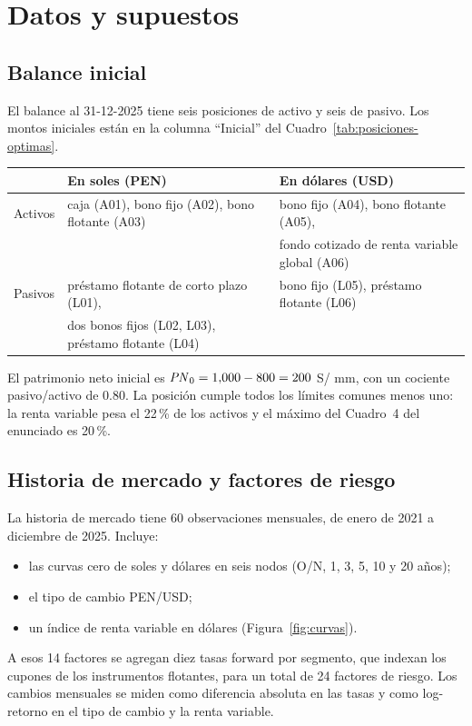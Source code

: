 \section{Datos y supuestos}\label{sec:datos}

\subsection{Balance inicial}
El balance al 31-12-2025 tiene seis posiciones de activo y seis de pasivo. Los montos iniciales están en la
columna ``Inicial'' del Cuadro~\ref{tab:posiciones-optimas}.

\begin{center}
\small
\begin{tabular}{lll}
\toprule
 & En soles (PEN) & En dólares (USD) \\
\midrule
Activos & caja (A01), bono fijo (A02), bono flotante (A03) & bono fijo (A04), bono flotante (A05), \\
 & & fondo cotizado de renta variable global (A06) \\
Pasivos & préstamo flotante de corto plazo (L01), & bono fijo (L05), préstamo flotante (L06) \\
 & dos bonos fijos (L02, L03), préstamo flotante (L04) & \\
\bottomrule
\end{tabular}
\end{center}

El patrimonio neto inicial es $\mathit{PN}_0 = 1{,}000 - 800 = 200$ S/ mm, con un cociente pasivo/activo de 0.80. La
posición cumple todos los límites comunes menos uno: la renta variable pesa el 22\,\% de los activos y el
máximo del Cuadro~4 del enunciado es 20\,\%.

\subsection{Historia de mercado y factores de riesgo}
La historia de mercado tiene 60 observaciones mensuales, de enero de 2021 a diciembre de 2025. Incluye:
\begin{itemize}
  \item las curvas cero de soles y dólares en seis nodos (O/N, 1, 3, 5, 10 y 20 años);
  \item el tipo de cambio PEN/USD;
  \item un índice de renta variable en dólares (Figura~\ref{fig:curvas}).
\end{itemize}
A esos 14 factores se agregan diez tasas forward por segmento, que indexan los cupones de los instrumentos
flotantes, para un total de 24 factores de riesgo. Los cambios mensuales se miden como diferencia absoluta
en las tasas y como log-retorno en el tipo de cambio y la renta variable.

